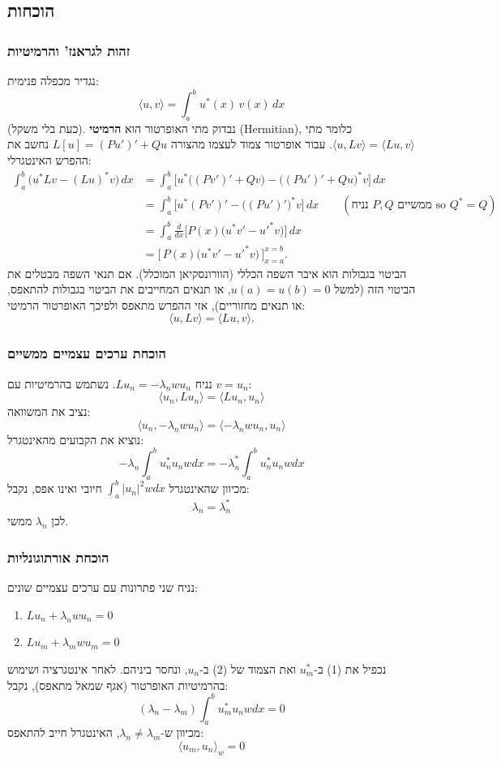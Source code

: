\subsection*{הוכחות}
\subsubsection*{זהות לגראנז' והרמיטיות}
נגדיר מכפלה פנימית:
\[
    \langle u, v \rangle = \int_{a}^{b} u^{*}(x)\, v(x)\, dx
\]
(כעת בלי משקל). נבדוק מתי האופרטור הוא \textbf{הרמיטי} (Hermitian), כלומר מתי
$\langle u, L v \rangle = \langle L u, v \rangle$. עבור אופרטור צמוד לעצמו מהצורה
$L[u]=(P u')' + Q u$ נחשב את ההפרש האינטגרלי:
\begin{align*}
\int_{a}^{b} \big(u^{*} L v - (L u)^{*} v\big)\,dx
&= \int_{a}^{b} \Big[ u^{*}\big((P v')' + Q v\big) - \big((P u')' + Q u\big)^{*} v \Big]\,dx \\
&= \int_{a}^{b} \Big[ u^{*}(P v')' - \big((P u')'\big)^{*} v \Big]\,dx
\qquad (\text{נניח }P,Q\text{ ממשיים so }Q^{*}=Q)\\
&= \int_{a}^{b} \frac{d}{dx}\!\big[ P(x)\big(u^{*} v' - u'^{*} v\big)\big]\,dx \\
&= \big[\,P(x)\big(u^{*} v' - u'^{*} v\big)\,\big]_{x=a}^{x=b}.
\end{align*}
הביטוי בגבולות הוא איבר השפה הכללי (הוורונסקיאן המוכלל). אם תנאי השפה מבטלים את
הביטוי הזה (למשל $u(a)=u(b)=0$, או תנאים המחייבים את הביטוי בגבולות להתאפס,
או תנאים מחזוריים), אזי ההפרש מתאפס ולפיכך האופרטור הרמיטי:
\[
    \langle u, L v \rangle = \langle L u, v \rangle .
\]

\subsubsection*{הוכחת ערכים עצמיים ממשיים}
נניח $L u_{n} = -\lambda_{n} w u_{n}$. נשתמש בהרמיטיות עם $v=u_{n}$:
\[
    \langle u_{n}, L u_{n} \rangle = \langle L u_{n}, u_{n} \rangle
\]
נציב את המשוואה:
\[
    \langle u_{n}, -\lambda_{n} w u_{n} \rangle = \langle -\lambda_{n} w u_{n}, u_{n} \rangle
\]
נוציא את הקבועים מהאינטגרל:
\[
    -\lambda_{n} \int_a^b u_{n}^{*} u_{n} w  dx = -\lambda_{n}^{*} \int_a^b u_{n}^{*} u_{n} w  dx
\]
מכיוון שהאינטגרל $\int_a^b |u_{n}|^{2} w  dx$ חיובי ואינו אפס, נקבל:
\[
    \lambda_{n} = \lambda_{n}^{*}
\]
לכן $\lambda_{n}$ ממשי.

\subsubsection*{הוכחת אורתוגונליות}
נניח שני פתרונות עם ערכים עצמיים שונים:
\begin{enumerate}
    \item $L u_{n} + \lambda_{n} w u_{n} = 0$
    \item $L u_{m} + \lambda_{m} w u_{m} = 0$
\end{enumerate}
נכפיל את (1) ב-$u_{m}^{*}$ ואת הצמוד של (2) ב-$u_{n}$, ונחסר ביניהם. לאחר אינטגרציה ושימוש בהרמיטיות האופרטור (אגף שמאל מתאפס), נקבל:
\[
    (\lambda_{n} - \lambda_{m}) \int_{a}^{b} u_{m}^{*} u_{n} w  dx = 0
\]
מכיוון ש-$\lambda_{n} \neq \lambda_{m}$, האינטגרל חייב להתאפס:
\[
    \langle u_{m}, u_{n} \rangle_{w} = 0
\]

